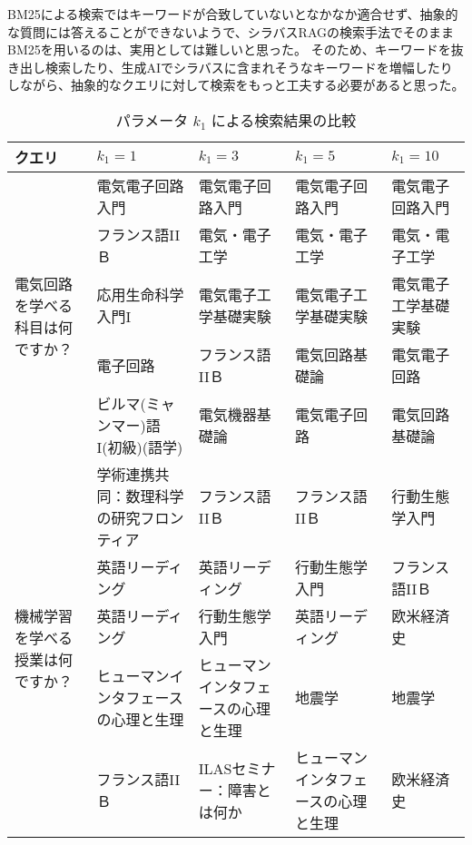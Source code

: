 BM25による検索ではキーワードが合致していないとなかなか適合せず、抽象的な質問には答えることができないようで、シラバスRAGの検索手法でそのままBM25を用いるのは、実用としては難しいと思った。
そのため、キーワードを抜き出し検索したり、生成AIでシラバスに含まれそうなキーワードを増幅したりしながら、抽象的なクエリに対して検索をもっと工夫する必要があると思った。

\begin{table}[htbp]
    \centering
    \caption{パラメータ \( k_1 \) による検索結果の比較}
    \label{tab:question_response_comparison}
    {\small
    \begin{tabular}{|p{2cm}|p{2.7cm}|p{2.7cm}|p{2.7cm}|p{2.7cm}|}
        \hline
        \textbf{クエリ} & \textbf{\( k_1=1 \)} & \textbf{\( k_1=3 \)} & \textbf{\( k_1=5 \)} & \textbf{\( k_1=10 \)} \\ \hline
        \multirow{5}{2cm}{電気回路を学べる科目は何ですか？} & 
        電気電子回路入門 & 電気電子回路入門 & 電気電子回路入門 & 電気電子回路入門 \\
        & フランス語IIＢ & 電気・電子工学 & 電気・電子工学 & 電気・電子工学 \\
        & 応用生命科学入門I & 電気電子工学基礎実験 & 電気電子工学基礎実験 & 電気電子工学基礎実験 \\
        & 電子回路 & フランス語IIＢ & 電気回路基礎論 & 電気電子回路 \\
        & ビルマ(ミャンマー)語I(初級)(語学) & 電気機器基礎論 & 電気電子回路 & 電気回路基礎論 \\ \hline
        \multirow{5}{2cm}{機械学習を学べる授業は何ですか？} & 
        学術連携共同：数理科学の研究フロンティア & フランス語IIＢ & フランス語IIＢ & 行動生態学入門 \\
        & 英語リーディング & 英語リーディング & 行動生態学入門 & フランス語IIＢ \\
        & 英語リーディング & 行動生態学入門 & 英語リーディング & 欧米経済史 \\
        & ヒューマンインタフェースの心理と生理 & ヒューマンインタフェースの心理と生理 & 地震学 & 地震学 \\
        & フランス語IIＢ & ILASセミナー：障害とは何か & ヒューマンインタフェースの心理と生理 & 欧米経済史 \\ \hline
    \end{tabular}
    }
\end{table}
